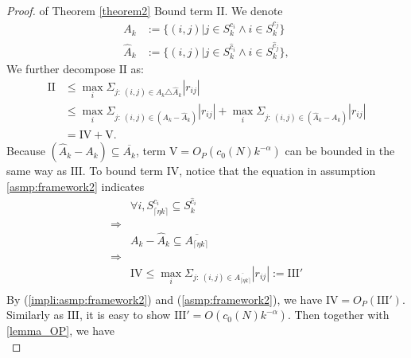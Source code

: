 \begin{proof}{ of Theorem \ref{theorem2}}
    Bound term $\mathrm{II}$. We denote 
    \begin{equation}
    	\begin{split}
    		A_{k} &:= \{ (i,j) | j\in S_{k}^{c_i} \land i \in S_{k}^{c_j} \} \\
            \hat A_k &:= \{ (i,j) | j\in S_{k}^{\hat c_i} \land i \in S_{k}^{\hat c_j} \}, 
    	\end{split}
    \end{equation}
    We further decompose $\mathrm{II}$ as: 
    \begin{equation}
    	\begin{split}
    		\mathrm{II} &\leq \max_i \Sigma_{j:\ (i,j)\in A_k \triangle \hat A_k }       |r_{ij}| \\
            &\leq \max_i \Sigma_{j:\ (i,j) \in (A_k - \hat A_k)} |r_{ij}| + 
            	\max_i \Sigma_{j:\ (i,j) \in (\hat A_k - A_k)} |r_{ij}| \\
            &= \mathrm{IV} + \mathrm{V}.
    	\end{split}
        \label{II decompose}
    \end{equation}    
    Because $(\hat A_k - A_k) \subseteq \overline{A_k}$, term $\mathrm{V} = O_P(c_0(N) k^{-\alpha})$ can be bounded in the same way as $\mathrm{III}$. To bound term $\mathrm{IV}$, notice that the equation in assumption \ref{asmp:framework2} indicates 
    \begin{equation}
    	\begin{split}
    	    & \forall i, S_{\lceil \eta k \rceil}^{c_i} \subseteq S_{k}^{\hat c_i} \\
            \Rightarrow & \\
            & A_k - \hat A_k \subseteq \overline{ A_{\lceil \eta k \rceil} }  \\
            \Rightarrow & \\
    		& \mathrm{IV} \leq \max_i \Sigma_{j:\ (i,j)\in\overline{A_{\lceil \eta k \rceil}}} |r_{ij}| := \mathrm{III'}  \\
    	\end{split}
     \label{impli:asmp:framework2}
    \end{equation} 
    By (\ref{impli:asmp:framework2}) and (\ref{asmp:framework2}), we have $\mathrm{IV} = O_P (\mathrm{III'})$. Similarly as $\mathrm{III}$, it is easy to show $\mathrm{III'} = O( c_0(N) k^{-\alpha} ) $. Then together with \autoref{lemma_OP}, we have
    \begin{equation}

\end{equation}
\end{proof}
